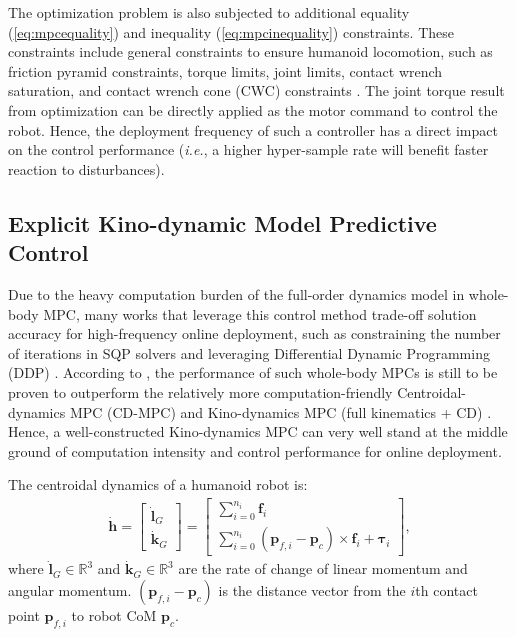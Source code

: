 The optimization problem is also subjected to additional equality (\ref{eq:mpcequality}) and inequality (\ref{eq:mpcinequality}) constraints. These constraints include general constraints to ensure humanoid locomotion, such as friction pyramid constraints, torque limits, joint limits, contact wrench saturation, and contact wrench cone (CWC) constraints \cite{caron2015stability}. The joint torque result from optimization can be directly applied as the motor command to control the robot. Hence, the deployment frequency of such a controller has a direct impact on the control performance (\textit{i.e.}, a higher hyper-sample rate will benefit faster reaction to disturbances). 


\subsection{Explicit Kino-dynamic Model Predictive Control}
\label{subsec:cdmpc}
Due to the heavy computation burden of the full-order dynamics model in whole-body MPC, many works that leverage this control method trade-off solution accuracy for high-frequency online deployment, such as constraining the number of iterations in SQP solvers \cite{khazoom2024tailoring, galliker2022planar} and leveraging Differential Dynamic Programming (DDP) \cite{dantec2022whole}. According to \cite{dantec2024centroidal}, the performance of such whole-body MPCs is still to be proven to outperform the relatively more computation-friendly Centroidal-dynamics MPC (CD-MPC) and Kino-dynamics MPC (full kinematics + CD) \cite{romualdi2022online, garcia2021mpc, he2024cdm, chignoli2021humanoid}. Hence, a well-constructed Kino-dynamics MPC can very well stand at the middle ground of computation intensity and control performance for online deployment.

The centroidal dynamics of a humanoid robot is:
\begin{align}
\label{eq:cd}
    \dot{\bm h}= \left[\begin{array}{c} 
    \dot{\bm l}_G\\
    \dot{\bm k}_G 
    \end{array} \right] = 
    \left[\begin{array}{c} 
    \sum_{i = 0}^{n_i}\bm f_i \\
    \sum_{i = 0}^{n_i}(\bm p_{f,i}-\bm p_c) \times \bm f_i + \bm \tau_i
    \end{array} \right],
\end{align}
where $\dot{\bm l}_G \in \mathbb R^3$ and $\dot{\bm k}_G \in \mathbb R^3$ are the rate of change of linear momentum and angular momentum. $(\bm p_{f,i}-\bm p_c)$ is the distance vector from the $i$th contact point $\bm p_{f,i}$ to robot CoM $\bm p_c$. 

